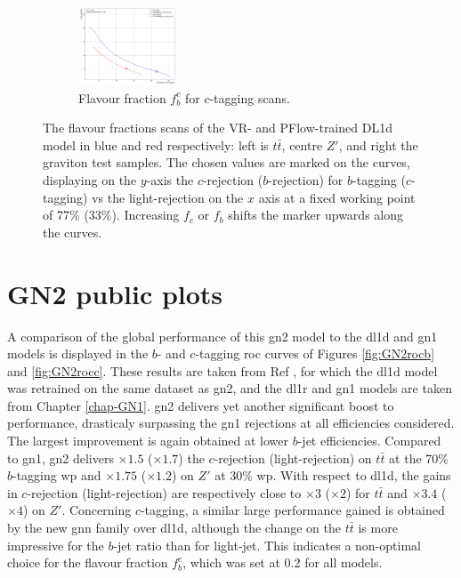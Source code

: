 \begin{figure}[h!]
\begin{subfigure}[b]{\textwidth}
    \includegraphics[width=0.32\textwidth]{Images/FTAG/VRDL1d/scansfraction/thesis_plot_frac_c/contour_fraction_graviton_2000.pdf}
    \caption{Flavour fraction $f_b^c$ for $c$-tagging scans.} 
    \label{fig:DL1dVRscanfc}
\end{subfigure}
  \caption{The flavour fractions scans of the VR- and PFlow-trained DL1d model in blue and red respectively: left is $t\bar{t}$, centre $Z'$, and right the graviton test samples. The chosen values are marked on the curves, displaying on the $y$-axis the $c$-rejection ($b$-rejection) for $b$-tagging ($c$-tagging) vs the light-rejection on the $x$ axis at a fixed working point of 77\% (33\%). Increasing $f_c$ or $f_b$ shifts the marker upwards along the curves. }
  \label{apfig:DL1dVRscanf}
\end{figure} 

\newpage
\section{GN2 public plots}
A comparison of the global performance of this \gls{gn2} model to the \gls{dl1d} and \gls{gn1} models is displayed in the $b$- and $c$-tagging \gls{roc} curves of Figures \ref{fig:GN2rocb} and \ref{fig:GN2rocc}. These results are taken from Ref \cite{ATL-PLOT-FTAG-2023-01}, for which the \gls{dl1d} model was retrained on the same dataset as \gls{gn2}, and the \gls{dl1r} and \gls{gn1} models are taken from Chapter \ref{chap-GN1}. \gls{gn2} delivers yet another significant boost to performance, drasticaly surpassing the \gls{gn1} rejections at all efficiencies considered. The largest improvement is again obtained at lower $b$-jet efficiencies. Compared to \gls{gn1}, \gls{gn2} delivers $\times 1.5$ ($\times 1.7$) the $c$-rejection (light-rejection) on $t\bar{t}$ at the 70\% $b$-tagging \gls{wp} and $\times 1.75$ ($\times 1.2$) on $Z'$ at 30\% \gls{wp}. With respect to \gls{dl1d}, the gains in $c$-rejection (light-rejection) are respectively close to $\times 3$ ($\times 2$) for $t\bar{t}$ and $\times 3.4$ ($\times 4$) on $Z'$. Concerning $c$-tagging, a similar large performance gained is obtained by the new \gls{gnn} family over \gls{dl1d}, although the change on the $t\bar{t}$ is more impressive for the $b$-jet ratio than for light-jet. This indicates a non-optimal choice for the flavour fraction $f^c_b$, which was set at 0.2 for all models.

